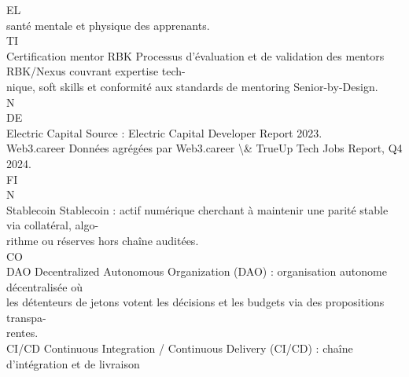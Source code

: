 \vspace{0.5em}
\vspace{0.5em}
\vspace{0.5em}
\vspace{0.5em}
EL\\
santé mentale et physique des apprenants.\\
\vspace{0.5em}
\vspace{0.5em}
\vspace{0.5em}
\vspace{0.5em}
TI\\
Certification mentor RBK                Processus d’évaluation et de validation des mentors RBK/Nexus couvrant expertise tech-\\
nique, soft skills et conformité aux standards de mentoring Senior-by-Design.\\
\vspace{0.5em}
\vspace{0.5em}
\vspace{0.5em}
\vspace{0.5em}
N\\
DE\\
Electric Capital                        Source : Electric Capital Developer Report 2023.\\
\vspace{0.5em}
Web3.career                             Données agrégées par Web3.career \textbackslash{}& TrueUp Tech Jobs Report, Q4 2024.\\
\vspace{0.5em}
\vspace{0.5em}
\vspace{0.5em}
\vspace{0.5em}
FI\\
N\\
Stablecoin                              Stablecoin : actif numérique cherchant à maintenir une parité stable via collatéral, algo-\\
rithme ou réserves hors chaîne auditées.\\
CO\\
DAO                                     Decentralized Autonomous Organization (DAO) : organisation autonome décentralisée où\\
les détenteurs de jetons votent les décisions et les budgets via des propositions transpa-\\
rentes.\\
\vspace{0.5em}
CI/CD                                   Continuous Integration / Continuous Delivery (CI/CD) : chaîne d’intégration et de livraison\\
